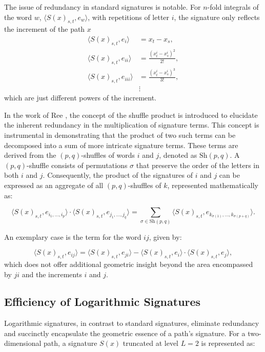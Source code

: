 The issue of redundancy in standard signatures is notable. For \(n\)-fold integrals of the word \( w \), \(\langle S(x)_{s,t}, e_w \rangle\), with repetitions of letter \( i \), the signature only reflects the increment of the path \( x \)
\begin{align}
    \langle S(x)_{s,t}, e_i \rangle &= x_t - x_s, \nonumber \\
    \langle S(x)_{s,t}, e_{ii} \rangle &= \frac{(x^i_t - x^i_s)^2}{2!},  \\
    \langle S(x)_{s,t}, e_{iii} \rangle &= \frac{(x^i_t - x^i_s)^3}{3!}, \nonumber \\
    &\vdots \nonumber
\end{align}
which are just different powers of the increment. 

In the work of Ree \cite{reeLieElementsAlgebra1958}, the concept of the shuffle product is introduced to elucidate the inherent redundancy in the multiplication of signature terms. This concept is instrumental in demonstrating that the product of two such terms can be decomposed into a sum of more intricate signature terms. These terms are derived from the \((p,q)\)-shuffles of words \( i \) and \( j \), denoted as \( \text{Sh}(p,q) \). A \((p,q)\)-shuffle consists of permutations \( \sigma \) that preserve the order of the letters in both \( i \) and \( j \). Consequently, the product of the signatures of \( i \) and \( j \) can be expressed as an aggregate of all \((p,q)\)-shuffles of \( k \), represented mathematically as:

\begin{equation}
    \langle S(x)_{s,t}, e_{i_1,\ldots,i_p} \rangle \cdot \langle S(x)_{s,t}, e_{j_1,\ldots,j_q} \rangle = \sum_{\sigma \in \text{Sh}(p,q)} \langle S(x)_{s,t}, e_{k_{\sigma(1)},\ldots,k_{\sigma(p+q)}} \rangle.
\end{equation}

An exemplary case is the term for the word \( ij \), given by:

\begin{equation}
   \langle S(x)_{s,t}, e_{ij} \rangle = \langle S(x)_{s,t}, e_{ji} \rangle - \langle S(x)_{s,t}, e_i \rangle \cdot \langle S(x)_{s,t}, e_j \rangle,
\end{equation}
which does not offer additional geometric insight beyond the area encompassed by \( ji \) and the increments \( i \) and \( j \).


\subsection{Efficiency of Logarithmic Signatures}
Logarithmic signatures, in contrast to standard signatures, eliminate redundancy and succinctly encapsulate the geometric essence of a path's signature. For a two-dimensional path, a signature \( S(x) \) truncated at level \( L = 2 \) is represented as:

